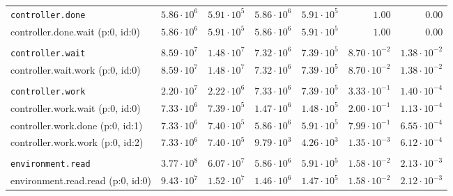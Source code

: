 \begin{table}[htbp]
{\begin{tabular}{lrrrrrr}
\\[-8pt]\texttt{controller.done}              & $5.86 \cdot 10^{6}$ & $5.91 \cdot 10^{5}$ & $5.86 \cdot 10^{6}$ & $5.91 \cdot 10^{5}$ &               $1.00$ &               $0.00$ \\
\hspace{3mm}controller.done.wait (p:0, id:0)  & $5.86 \cdot 10^{6}$ & $5.91 \cdot 10^{5}$ & $5.86 \cdot 10^{6}$ & $5.91 \cdot 10^{5}$ &               $1.00$ &               $0.00$ \\
\\[-8pt]\texttt{controller.wait}              & $8.59 \cdot 10^{7}$ & $1.48 \cdot 10^{7}$ & $7.32 \cdot 10^{6}$ & $7.39 \cdot 10^{5}$ & $8.70 \cdot 10^{-2}$ & $1.38 \cdot 10^{-2}$ \\
\hspace{3mm}controller.wait.work (p:0, id:0)  & $8.59 \cdot 10^{7}$ & $1.48 \cdot 10^{7}$ & $7.32 \cdot 10^{6}$ & $7.39 \cdot 10^{5}$ & $8.70 \cdot 10^{-2}$ & $1.38 \cdot 10^{-2}$ \\
\\[-8pt]\texttt{controller.work}              & $2.20 \cdot 10^{7}$ & $2.22 \cdot 10^{6}$ & $7.33 \cdot 10^{6}$ & $7.39 \cdot 10^{5}$ & $3.33 \cdot 10^{-1}$ & $1.40 \cdot 10^{-4}$ \\
\hspace{3mm}controller.work.wait (p:0, id:0)  & $7.33 \cdot 10^{6}$ & $7.39 \cdot 10^{5}$ & $1.47 \cdot 10^{6}$ & $1.48 \cdot 10^{5}$ & $2.00 \cdot 10^{-1}$ & $1.13 \cdot 10^{-4}$ \\
\hspace{3mm}controller.work.done (p:0, id:1)  & $7.33 \cdot 10^{6}$ & $7.40 \cdot 10^{5}$ & $5.86 \cdot 10^{6}$ & $5.91 \cdot 10^{5}$ & $7.99 \cdot 10^{-1}$ & $6.55 \cdot 10^{-4}$ \\
\hspace{3mm}controller.work.work (p:0, id:2)  & $7.33 \cdot 10^{6}$ & $7.40 \cdot 10^{5}$ & $9.79 \cdot 10^{3}$ & $4.26 \cdot 10^{3}$ & $1.35 \cdot 10^{-3}$ & $6.12 \cdot 10^{-4}$ \\
\\[-8pt]\texttt{environment.read}             & $3.77 \cdot 10^{8}$ & $6.07 \cdot 10^{7}$ & $5.86 \cdot 10^{6}$ & $5.91 \cdot 10^{5}$ & $1.58 \cdot 10^{-2}$ & $2.13 \cdot 10^{-3}$ \\
\hspace{3mm}environment.read.read (p:0, id:0) & $9.43 \cdot 10^{7}$ & $1.52 \cdot 10^{7}$ & $1.46 \cdot 10^{6}$ & $1.47 \cdot 10^{5}$ & $1.58 \cdot 10^{-2}$ & $2.12 \cdot 10^{-3}$ \\

\end{tabular}}
\end{table}
